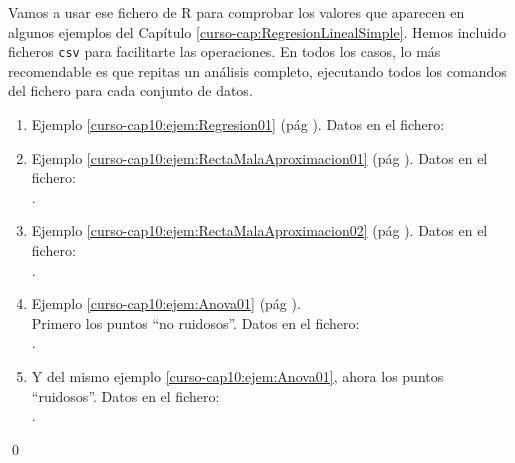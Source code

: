 \documentclass[10pt,a4paper]{article}\usepackage[]{graphicx}\usepackage[]{color}
\begin{document}
\begin{center}
\end{center}

\begin{ejercicio}
\label{tut10:ejercicio03}
Vamos a usar ese fichero de R para comprobar los valores que aparecen en algunos ejemplos del Capítulo \ref{curso-cap:RegresionLinealSimple}. Hemos incluido ficheros {\tt csv} para facilitarte las operaciones. En todos los casos, lo más recomendable es que repitas un análisis completo, ejecutando todos los comandos del fichero para cada conjunto de datos.
\begin{enumerate}
    \item Ejemplo \ref{curso-cap10:ejem:Regresion01} (pág \pageref{curso-cap10:ejem:Regresion01}). Datos en el fichero:\\

    \item Ejemplo \ref{curso-cap10:ejem:RectaMalaAproximacion01} (pág \pageref{curso-cap10:ejem:RectaMalaAproximacion01}). Datos en el fichero:\\
        .

    \item Ejemplo \ref{curso-cap10:ejem:RectaMalaAproximacion02} (pág \pageref{curso-cap10:ejem:RectaMalaAproximacion02}). Datos en el fichero:\\
        .

    \item Ejemplo \ref{curso-cap10:ejem:Anova01} (pág \pageref{curso-cap10:ejem:Anova01}).\\
        Primero los puntos ``no ruidosos''.  Datos en el fichero:\\
        .

    \item Y del mismo ejemplo \ref{curso-cap10:ejem:Anova01},
        ahora los puntos ``ruidosos''.  Datos en el fichero:\\
        .
\end{enumerate}
\qed
\end{ejercicio}
\end{document}

